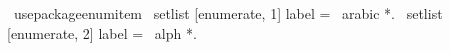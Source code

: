 \ usepackage{enumitem}
 \ setlist [enumerate, 1] {label = \ arabic *.}
 \ setlist [enumerate, 2] {label = \ alph *.}